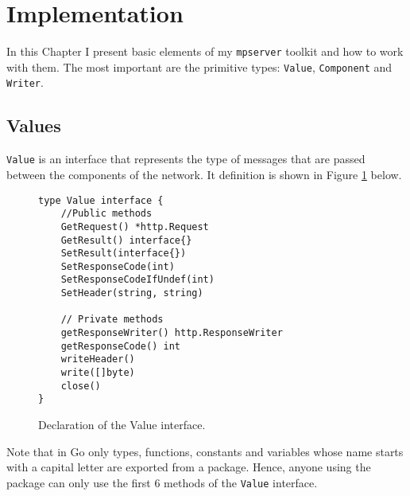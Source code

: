 \section{Implementation}
\label{sec:impl}
In this Chapter I present basic elements of my \texttt{mpserver} toolkit
and how to work with them. The most important are the primitive types:
\texttt{Value}, \texttt{Component} and \texttt{Writer}.

\subsection{Values}
\texttt{Value} is an interface that represents the type of messages that are
passed between the components of the network. It definition is shown
in Figure \ref{fig:Value} below.

\begin{figure}[h]
\centering
\begin{lstlisting}
type Value interface {
    //Public methods
    GetRequest() *http.Request
    GetResult() interface{}
    SetResult(interface{})
    SetResponseCode(int)
    SetResponseCodeIfUndef(int)
    SetHeader(string, string)

    // Private methods
    getResponseWriter() http.ResponseWriter
    getResponseCode() int
    writeHeader()
    write([]byte)
    close()
}
\end{lstlisting}
\caption[scale=1.0]{Declaration of the Value interface.}
\label{fig:Value}
\end{figure}

Note that in Go only types, functions, constants and variables whose name
starts with a capital letter are exported from a package. Hence, anyone
using the package can only use the first 6 methods of the \texttt{Value}
interface.

